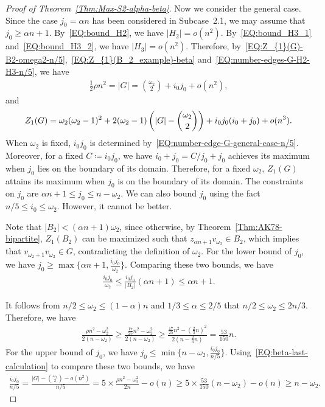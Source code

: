 \documentclass[11pt,a4paper]{article}
\begin{document}
\begin{proof}[Proof of Theorem~\ref{Thm:Max-S2-alpha-beta}]
Now we consider the general case. 
Since the case $j_0 = \alpha n$ has been considered in Subcase~2.1, we may assume that $j_0 \ge \alpha n+1$. 
By~\eqref{EQ:bound_H2}, we have $|H_2| = o(n^2)$. 
By~\eqref{EQ:bound_H3_1} and~\eqref{EQ:bound_H3_2}, we have $|H_3| = o(n^2)$. 
Therefore, by~\eqref{EQ:Z_{1}(G)-B2-omega2-n/5},~\eqref{EQ:Z_{1}(B_2_example)-beta} and~\eqref{EQ:number-edges-G-H2-H3-n/5}, we have 
\begin{align}\label{EQ:number-edge-G-general-case-n/5}
\frac{1}{2} \rho n^2 
= |G| 
= \binom{\omega_2}{2} + i_0j_0 + o(n^2),    
\end{align}
and 
\begin{align}\label{EQ:Z_{1}(G)-general-case-n/5}
Z_{1}(G) 
= \omega_2 (\omega_2 -1)^2 + 2(\omega_2 -1) \left(|G| - \binom{\omega_2}{2}\right)+i_0j_0 (i_0+j_0) + o(n^3). 
\end{align}
When $\omega_2$ is fixed, $i_0j_0$ is determined by~\eqref{EQ:number-edge-G-general-case-n/5}. 
Moreover, for a fixed $C \coloneqq i_0j_0$, we have $i_0 + j_0 = C/{j_0}+j_0$ achieves its maximum when $j_0$ lies on the boundary of its domain. 
Therefore, for a fixed $\omega_2$, $Z_{1}(G)$ attains its maximum when $j_0$ is on the boundary of its domain. 
The constraints on $j_0$ are $ \alpha n+1 \le j_0 \le n -\omega_2$.
We can also bound $j_0$ using the fact $n/5 \le i_0 \le \omega_2$. However, it cannot be better. 

Note that $|B_2| < \left(\alpha n+1\right)\omega_2$, since otherwise, by Theorem~\ref{Thm:AK78-bipartite}, $Z_{1}(B_2)$ can be maximized such that $z_{\alpha n+1}v_{\omega_2} \in B_2$, which implies that $v_{\omega_2 +1}v_{\omega_2} \in G$, contradicting the definition of $\omega_2$. 
For the lower bound of $j_0$, we have $j_0 \ge \max\big\{\alpha n +1, \tfrac{i_0 j_0}{\omega_2} \big\}$. 
Comparing these two bounds, we have
\begin{align*}
\frac{i_0 j_0}{\omega_2} 
\le \frac{i_0j_0}{|B_2|} \left(\alpha n + 1\right)
\le \alpha n+1. 
\end{align*}

It follows from $n/2 \le \omega_2 \le \left(1-\alpha\right) n$ and $1/3 \le \alpha \le 2/5$ that $n/2 \le \omega_2 \le 2n/3$. 
Therefore, we have 
\begin{align}\label{EQ:beta-last-calculation}
\frac{\rho n^2 - \omega_2^2}{2(n-\omega_2)} 
\ge \frac{\frac{17}{25} n^2 - \omega_2^2}{2(n-\omega_2)}
\ge \frac{\frac{17}{25} n^2 - \left(\frac{2}{3}n\right)^2}{2\left(n-\frac{2}{3}n\right)}
= \frac{53}{150}n. 
\end{align}
For the upper bound of $j_0$, we have $j_0 \le \min\big\{n - \omega_2, \tfrac{i_0 j_0}{n/5}\big\}$. 
Using~\eqref{EQ:beta-last-calculation} to compare these two bounds, we have
\begin{align*}
\frac{i_0 j_0}{n/5} 
= \frac{|G|- \binom{\omega_2}{2}-o(n^2)}{n/5}
= 5 \times \frac{\rho n^2- \omega_2^2}{2n} - o(n)
\ge 5 \times \frac{53}{150} \left(n-\omega_2\right) - o(n)
\ge n - \omega_2. 
\end{align*}


\end{proof}
\end{document}
